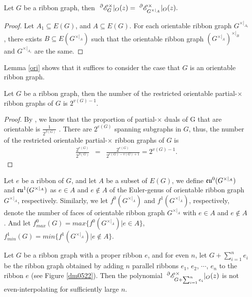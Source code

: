 \begin{lemma}\label{ori}
 Let $G$ be a  ribbon graph, then
$~^{\partial}{{\mathscr{E}}}^{\times}_{G}|_O(z)=~^{\partial}{{\mathscr{E}}}^{\times}_{G^{\times|_{A}}}|_O(z).$
\end{lemma}

\begin{proof}
Let $A_{1}\subseteq E(G)$, and $A\subseteq E(G)$.
For each  orientable ribbon graph $G^{\times|_{A_{1}}}$,  there exists  $B\subseteq E(G^{\times|_{A}})$ such that the  orientable ribbon graph
   $(G^{\times|_{A}})^{\times|_{B}}$  and $G^{\times|_{A_{1}}}$  are the same.

\end{proof}


 Lemma \ref{ori} shows that   it suffices to consider the case that  $G$ is an orientable ribbon graph.


\begin{lemma}\label{num}
Let $G$ be a  ribbon graph, then the number of the restricted orientable partial-$\times$ ribbon graphs of $G$ is $2^{v(G)-1}$.
\end{lemma}
\begin{proof}
By \cite{GMT21a}, we know  that  the proportion of partial-$\times$ duals of G
that are orientable is $\frac{1}{2^{\beta(G)}}$
.  There are $2^{e(G)}$ spanning subgraphs in $G$, thus, the number of the restricted orientable partial-$\times$ ribbon graphs of $G$ is
\begin{eqnarray*}
\frac{ 2^{e(G)}}{2^{\beta(G)}} &=& \frac{2^{e(G)}}{2^{e(G)-v(G)+1}}
=2^{v(G)-1}.\label{2vG-1}
\end{eqnarray*}

\end{proof}



Let $e$ be a ribbon of $G$, and let $A$ be a subset of $E(G)$,  we  define  ${\mathfrak{eu}}^{0}(G^{\times|_{A}})$ and ${\mathfrak{eu}}^{1}(G^{\times|_{A}})$ as $e\in A$ and  $e\notin A$ of the Euler-genus of orientable ribbon graph $G^{\times|_{A}}$, respectively. Similarly,
 we let  $f^{0}(G^{\times|_{A}})$ and $f^{1}(G^{\times|_{A}})$, respectively,  denote the number of     faces of  orientable ribbon graph $G^{\times|_{A}}$ with $e\in A$ and  $e\notin A$. And let
 $ f^{0}_{max}(G)=max\{f^{0}(G^{\times|_{A}})| e\in A\}$,
 $ f^{1}_{min}(G)=min\{f^{1}(G^{\times|_{A}})| e\notin A\}$.





\begin{thm}\label{tl}
Let $G$ be a ribbon graph with a  proper ribbon $e$, and for even $n$, let $G+\sum ^{n}_{i=1}e_{i}$ be the ribbon graph obtained by adding $n$  parallel ribbons $e_1$, $e_2$, $\cdots$,  $e_n$ to the ribbon $e$  (see Figure \ref{dm0522}). Then the polynomial $~^{\partial}{{\mathscr{E}}}^{\times}_{G+\sum ^{n}_{i=1}e_{i}}|_O(z)$ is not  even-interpolating for   sufficiently large $n$.

\end{thm}



